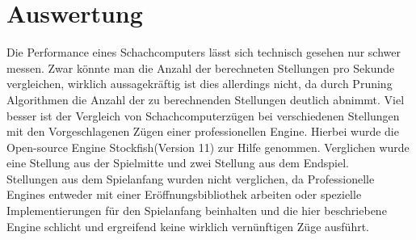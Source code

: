 \documentclass[a4paper, 12pt]{article}
\begin{document}
\section{Auswertung}
Die Performance eines Schachcomputers lässt sich technisch gesehen nur schwer messen. Zwar könnte man die Anzahl der berechneten Stellungen pro Sekunde vergleichen, wirklich aussagekräftig ist dies allerdings nicht, da  durch Pruning Algorithmen die Anzahl der zu berechnenden Stellungen deutlich abnimmt\cite[Absatz: savings]{alphabeta}.
Viel besser ist der Vergleich von Schachcomputerzügen bei verschiedenen Stellungen mit den Vorgeschlagenen Zügen einer professionellen Engine.
Hierbei wurde die Open-source Engine Stockfish(Version 11) zur Hilfe genommen.
Verglichen wurde eine Stellung aus der Spielmitte und zwei Stellung aus dem Endspiel.\\
Stellungen aus dem Spielanfang wurden nicht verglichen, da Professionelle Engines entweder mit einer Eröffnungsbibliothek arbeiten oder spezielle Implementierungen für den Spielanfang beinhalten und die hier beschriebene Engine schlicht und ergreifend keine wirklich vernünftigen Züge ausführt.\\
\end{document}
